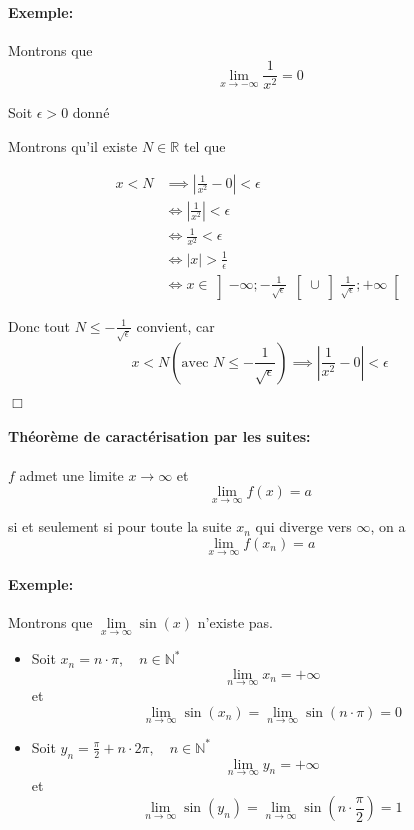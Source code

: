 \documentclass[
    11pt,
    a4paper,
    oneside,
    headinlcude, footinclude,
    twoside,
]{report}
\newcommand{\cqfd}[0]{\begin{flushright}$\Box$\end{flushright}}
\begin{document}
\paragraph{Exemple:}

Montrons que $$ \lim_{x \to - \infty} \frac{1}{x^{2}} = 0$$

Soit $\epsilon > 0$  donné

Montrons qu'il existe $N \in \mathbb{R}$  tel que

\[
\begin{split}
x < N &\implies | \frac{1}{x^{2}} - 0 | < \epsilon\\
&\iff |\frac{1}{x^{2}}| < \epsilon\\
&\iff \frac{1}{x^{2}} < \epsilon\\
&\iff |x| > \frac{1}{\epsilon}\\
&\iff x \in \left] - \infty; - \frac{1}{\sqrt{\epsilon}}\ \right[ \cup \left] \frac{1}{\sqrt{\epsilon}}; + \infty \right[
\end{split}
\]

Donc tout $N \leq - \frac{1}{\sqrt{\epsilon}}$ convient, car $$x < N ( \text{
avec }  N \leq - \frac{1}{\sqrt{\epsilon}}) \implies |\frac{1}{x^{2}} - 0| <
\epsilon$$

\cqfd

\paragraph{Théorème de caractérisation par les suites:}

$f$  admet une limite $x \to \infty$ et $$ \lim_{x \to \infty} f(x) = a$$

si et seulement si pour toute la suite  $x_{n}$ qui diverge vers $\infty$, on
a $$ \lim_{x \to \infty} f(x_{n}) = a$$

\paragraph{Exemple:}

Montrons que $\lim\limits_{x \to \infty} \sin(x)$ n'existe pas.

\begin{itemize}
\item Soit $x_{n} = n \cdot \pi, \quad n \in \mathbb{N}^{*}$ 
$$ \lim_{n \to \infty} x_{n} = + \infty$$ et $$ \lim_{n \to \infty}
\sin(x_{n}) = \lim_{n \to \infty} \sin(n \cdot \pi) = 0$$
\item Soit $y_{n} =  \frac{\pi}{2} + n \cdot 2 \pi, \quad n \in \mathbb{N}^{*}$ 
$$ \lim_{n \to \infty} y_{n} = + \infty$$ et $$ \lim_{n \to \infty}
\sin(y_{n}) = \lim_{n \to \infty} \sin(n \cdot \frac{\pi}{2}) = 1$$
\end{itemize}
\end{document}
